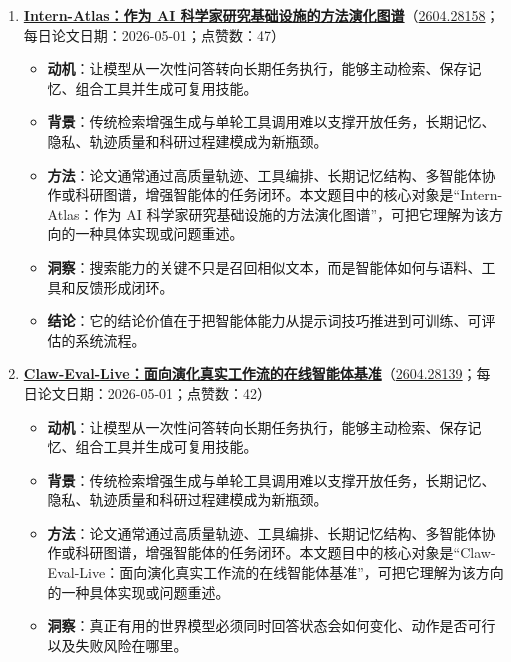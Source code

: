 \begin{enumerate}[leftmargin=1.5em]
\begin{itemize}[leftmargin=1.5em]
    \item \textbf{洞察}：这篇工作的关键不在单点技巧，而在它把数据、模型、推理、奖励与评测中的某个环节重新组织进系统闭环。
    \item \textbf{结论}：它的结论价值在于把智能体能力从提示词技巧推进到可训练、可评估的系统流程。
  \end{itemize}
  \item \textbf{\href{https://huggingface.co/papers/2604.28158}{Intern-Atlas：作为 AI 科学家研究基础设施的方法演化图谱}}（\href{https://arxiv.org/abs/2604.28158}{2604.28158}；每日论文日期：2026-05-01；点赞数：47）
  \begin{itemize}[leftmargin=1.5em]
    \item \textbf{动机}：让模型从一次性问答转向长期任务执行，能够主动检索、保存记忆、组合工具并生成可复用技能。
    \item \textbf{背景}：传统检索增强生成与单轮工具调用难以支撑开放任务，长期记忆、隐私、轨迹质量和科研过程建模成为新瓶颈。
    \item \textbf{方法}：论文通常通过高质量轨迹、工具编排、长期记忆结构、多智能体协作或科研图谱，增强智能体的任务闭环。本文题目中的核心对象是“Intern-Atlas：作为 AI 科学家研究基础设施的方法演化图谱”，可把它理解为该方向的一种具体实现或问题重述。
    \item \textbf{洞察}：搜索能力的关键不只是召回相似文本，而是智能体如何与语料、工具和反馈形成闭环。
    \item \textbf{结论}：它的结论价值在于把智能体能力从提示词技巧推进到可训练、可评估的系统流程。
  \end{itemize}
  \item \textbf{\href{https://huggingface.co/papers/2604.28139}{Claw-Eval-Live：面向演化真实工作流的在线智能体基准}}（\href{https://arxiv.org/abs/2604.28139}{2604.28139}；每日论文日期：2026-05-01；点赞数：42）
  \begin{itemize}[leftmargin=1.5em]
    \item \textbf{动机}：让模型从一次性问答转向长期任务执行，能够主动检索、保存记忆、组合工具并生成可复用技能。
    \item \textbf{背景}：传统检索增强生成与单轮工具调用难以支撑开放任务，长期记忆、隐私、轨迹质量和科研过程建模成为新瓶颈。
    \item \textbf{方法}：论文通常通过高质量轨迹、工具编排、长期记忆结构、多智能体协作或科研图谱，增强智能体的任务闭环。本文题目中的核心对象是“Claw-Eval-Live：面向演化真实工作流的在线智能体基准”，可把它理解为该方向的一种具体实现或问题重述。
    \item \textbf{洞察}：真正有用的世界模型必须同时回答状态会如何变化、动作是否可行以及失败风险在哪里。

\end{itemize}
\end{enumerate}
